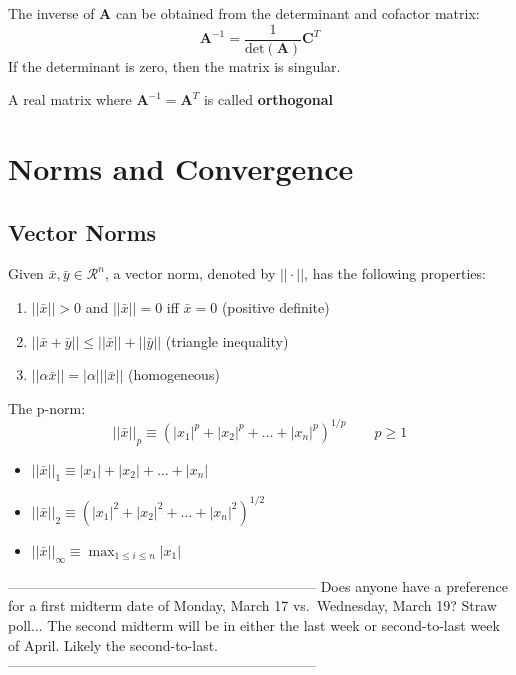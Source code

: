 \documentclass[12pt]{article}
\newcommand{\ve}[1]{\ensuremath{\mathbf{#1}}}
\begin{document}
The inverse of $\ve{A}$ can be obtained from the determinant and cofactor matrix:
%
\begin{equation}
\ve{A}^{-1} = \frac{1}{\text{det}(\ve{A})}\ve{C}^T \nonumber
\end{equation}
%
If the determinant is zero, then the matrix is singular.

A real matrix where $\ve{A}^{-1} = \ve{A}^T$ is called \textbf{orthogonal}


\section{Norms and Convergence}
\subsection{Vector Norms}
Given $\bar{x}, \bar{y} \in \mathcal{R}^n$, a vector norm, denoted by $|| \cdot ||$, has the following properties:
%
\begin{enumerate}
\item $||\bar{x}|| > 0$ and $||\bar{x}|| = 0$ iff $\bar{x} = 0$ (positive definite)
\item $||\bar{x} + \bar{y}|| \leq ||\bar{x}|| + ||\bar{y}||$ (triangle inequality)
\item $||\alpha \bar{x}|| = |\alpha| ||\bar{x}||$ (homogeneous)
\end{enumerate}

The p-norm:
%
\begin{equation}
||\bar{x}||_p \equiv (|x_1|^p + |x_2|^p + \dots + |x_n|^p)^{1/p} \qquad p \geq 1 \nonumber
\end{equation}
%
\begin{itemize}
\item $||\bar{x}||_1 \equiv |x_1| + |x_2| + \dots + |x_n|$
\item $||\bar{x}||_2 \equiv (|x_1|^2 + |x_2|^2 + \dots + |x_n|^2)^{1/2}$
\item $||\bar{x}||_{\infty} \equiv \displaystyle \max_{1 \leq i \leq n} |x_1|$
\end{itemize}

------------------------------------------------------------------
Does anyone have a preference for a first midterm date of Monday, March 17 vs.\ Wednesday, March 19? Straw poll... The second midterm will be in either the last week or second-to-last week of April. Likely the second-to-last.
------------------------------------------------------------------ 
\end{document}
